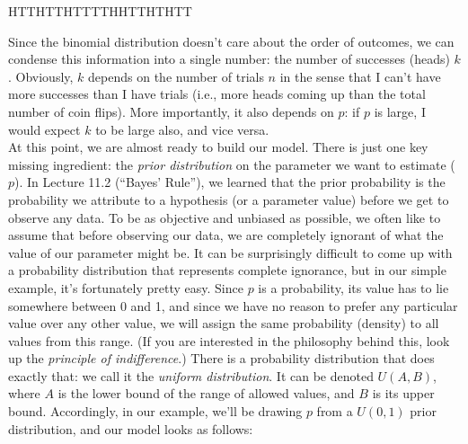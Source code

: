 \documentclass[12pt]{article}
\newcommand*{\Biggg}[1]{\vcenter{\hbox{\scalebox{3}{\ensuremath#1}}}}
\newcommand*{\Bigggg}[1]{\vcenter{\hbox{\scalebox{8}{\ensuremath#1}}}}
\begin{document}
\begin{center}
HTTHTTHTTTTHHTTHTHTT
\end{center}

\noindent Since the binomial distribution doesn't care about the order of outcomes, we can condense this information into a single number: the number of successes (heads) $k$. Obviously, $k$ depends on the number of trials $n$ in the sense that I can't have more successes than I have trials (i.e., more heads coming up than the total number of coin flips). More importantly, it also depends on $p$: if $p$ is large, I would expect $k$ to be large also, and vice versa. \\

\noindent At this point, we are almost ready to build our model. There is just one key missing ingredient: the \textit{prior distribution} on the parameter we want to estimate ($p$). In Lecture 11.2 (``Bayes' Rule''), we learned that the prior probability is the probability we attribute to a hypothesis (or a parameter value) before we get to observe any data. To be as objective and unbiased as possible, we often like to assume that before observing our data, we are completely ignorant of what the value of our parameter might be. It can be surprisingly difficult to come up with a probability distribution that represents complete ignorance, but in our simple example, it's fortunately pretty easy. Since $p$ is a probability, its value has to lie somewhere between 0 and 1, and since we have no reason to prefer any particular value over any other value, we will assign the same probability (density) to all values from this range. (If you are interested in the philosophy behind this, look up the \textit{principle of indifference}.) There is a probability distribution that does exactly that: we call it the \textit{uniform distribution}. It can be denoted $U(\!A, B)$, where $A$ is the lower bound of the range of allowed values, and $B$ is its upper bound. Accordingly, in our example, we'll be drawing $p$ from a $U(0, 1)$ prior distribution, and our model looks as follows: \\

\begin{figure}[h]
\centering
{}
\end{figure}
\end{document}
